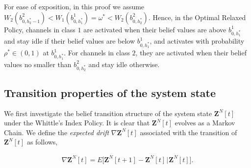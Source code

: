 \documentclass[11pt,twocolumn]{IEEEtran}
\begin{document}
For ease of exposition, in this proof we assume $W_2(b^2_{0,h^*_2-1})<W_1(b^1_{0,h^*_1})=\omega^*<W_2(b^2_{0,h^*_2})$. Hence, in the Optimal Relaxed Policy, channels in class $1$ are activated when their belief values are above $b^1_{0,h^*_1}$ and stay idle if their belief values are below $b^1_{0,h^*_1}$, and activates with probability $\rho^* {\in} (0,1)$ at $b^1_{0,h^*_1}$.  For channels in class $2$, they are activated when their belief values no smaller than $b^2_{0,h^*_2}$ and stay idle otherwise.

\subsection{Transition properties of the system state}


We first investigate the belief transition structure of the system state $\bm Z^N[t]$ under the Whittle's Index Policy. It is clear that $\bm Z^N[t]$ evolves as a Markov Chain. We define the \emph{expected drift} $\nabla \bm Z^N[t]$ associated with the transition of $\bm Z^N[t]$ as follows,

\begin{align}
\nabla \bm Z^N[t] =E\big[\bm Z^N[t+1]- \bm Z^N[t] \hspace{1pt}\big|\hspace{1pt} \bm Z^N[t] \big]. \label{eq:drift_def}
\end{align}
\end{document}
